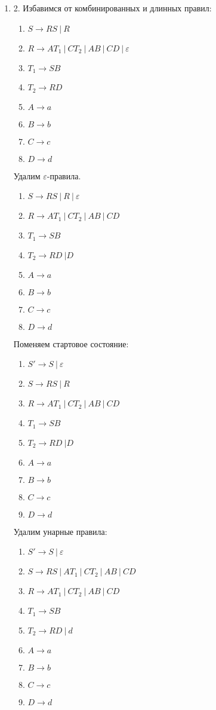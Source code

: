 \documentclass[12pt]{article}
\newenvironment{MyList}[1][4pt]{
  \begin{enumerate}[1.]
  \setlength{\parskip}{0pt}
  \setlength{\itemsep}{#1}
}{       
  \end{enumerate}
}
\begin{document}
\begin{MyList}
	\item[2.]
	Избавимся от комбинированных и длинных правил:
	\begin{MyList}
		\item $S \to RS \ | \ R$
		\item $R \to AT_1 \ | \ CT_2 \ | \ AB \ | \ CD \ | \ \varepsilon$
		\item $T_1 \to SB$
		\item $T_2 \to RD$
		\item $A \to a$
		\item $B \to b$
		\item $C \to c$
		\item $D \to d$
	\end{MyList}
	
	Удалим $\varepsilon$-правила.
	\begin{MyList}
		\item $S \to RS \ | \ R \ | \ \varepsilon$
		\item $R \to AT_1 \ | \ CT_2 \ | \ AB \ | \ CD $
		\item $T_1 \to SB$
		\item $T_2 \to RD \ | D$
		\item $A \to a$
		\item $B \to b$
		\item $C \to c$
		\item $D \to d$
	\end{MyList}
	
	Поменяем стартовое состояние:
	\begin{MyList}
		\item $S' \to S \ | \ \varepsilon$
		\item $S \to RS \ | \ R$
		\item $R \to AT_1 \ | \ CT_2 \ | \ AB \ | \ CD $
		\item $T_1 \to SB$
		\item $T_2 \to RD \ | D$
		\item $A \to a$
		\item $B \to b$
		\item $C \to c$
		\item $D \to d$
	\end{MyList}
	
	Удалим унарные правила:
	\begin{MyList}
		\item $S' \to S \ | \ \varepsilon$
		\item $S \to RS \ | \ AT_1 \ | \ CT_2 \ | \ AB \ | \ CD $
		\item $R \to AT_1 \ | \ CT_2 \ | \ AB \ | \ CD $
		\item $T_1 \to SB$
		\item $T_2 \to RD \ | \ d$
		\item $A \to a$
		\item $B \to b$
		\item $C \to c$
		\item $D \to d$
	\end{MyList}
	

\end{MyList}
\end{document}
